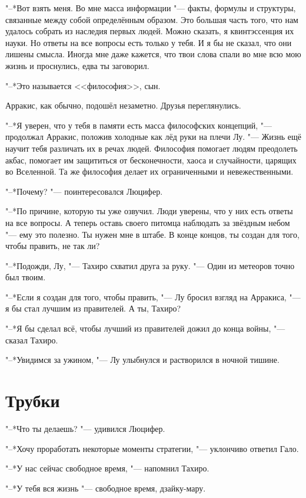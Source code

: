 \documentclass[a4paper,10pt]{book}
\begin{document}
"--*Вот взять меня.
Во мне масса информации "--- факты, формулы и структуры, связанные между собой определённым образом.
Это большая часть того, что нам удалось собрать из наследия первых людей.
Можно сказать, я квинтэссенция их науки.
Но ответы на все вопросы есть только у тебя. 
И я бы не сказал, что они лишены смысла.
Иногда мне даже кажется, что твои слова спали во мне всю мою жизнь и проснулись, едва ты заговорил.

"--*Это называется <<философия>>, сын.

Арракис, как обычно, подошёл незаметно.
Друзья переглянулись.

"--*Я уверен, что у тебя в памяти есть масса философских концепций, "--- продолжал Арракис, положив холодные как лёд руки на плечи Лу.
"--- Жизнь ещё научит тебя различать их в речах людей.
Философия помогает людям преодолеть акбас, помогает им защититься от бесконечности, хаоса и случайности, царящих во Вселенной.
Та же философия делает их ограниченными и невежественными.

"--*Почему? "--- поинтересовался Люцифер.

"--*По причине, которую ты уже озвучил.
Люди уверены, что у них есть ответы на все вопросы.
А теперь оставь своего питомца наблюдать за звёздным небом "--- ему это полезно.
Ты нужен мне в штабе.
В конце концов, ты создан для того, чтобы править, не так ли?

"--*Подожди, Лу, "--- Тахиро схватил друга за руку.
"--- Один из метеоров точно был твоим.

"--*Если я создан для того, чтобы править, "--- Лу бросил взгляд на Арракиса, "--- я бы стал лучшим из правителей.
А ты, Тахиро?

"--*Я бы сделал всё, чтобы лучший из правителей дожил до конца войны, "--- сказал Тахиро.

"--*Увидимся за ужином, "--- Лу улыбнулся и растворился в ночной тишине.

\section{Трубки}

"--*Что ты делаешь? "--- удивился Люцифер.

"--*Хочу проработать некоторые моменты стратегии, "--- уклончиво ответил Гало.

"--*У нас сейчас свободное время, "--- напомнил Тахиро.

"--*У тебя вся жизнь "--- свободное время, дзайку-мару.
\end{document}
